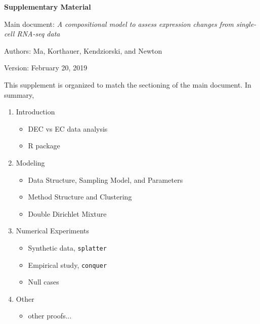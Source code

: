 \documentclass[aoas,preprint]{imsart}
\begin{document}
\large
\centerline{\bf Supplementary Material }

\noindent
Main document: {\em A compositional model to assess expression changes from single-cell RNA-seq data}

\vspace{.2in}
\noindent
Authors: Ma, Korthauer, Kendziorski, and Newton

\vspace{.2in}
\noindent
Version: February 20, 2019

\vspace{.4in}

\noindent
This supplement is organized to match the sectioning of the main document.   In summary,

\begin{enumerate}
\item Introduction
   \begin{itemize}
   \item DEC vs EC data analysis
   \item R package
   \end{itemize}
\item Modeling
 \begin{itemize}
  \item Data Structure, Sampling Model, and Parameters
  \item Method Structure and Clustering 
  \item Double Dirichlet Mixture
  \end{itemize}
\item Numerical Experiments
   \begin{itemize}
   \item Synthetic data, \verb+splatter+
   \item Empirical study, \verb+conquer+
   \item Null cases 
   \end{itemize}
\item Other
  \begin{itemize}
   \item other proofs...
  \end{itemize}
\end{enumerate}
\end{document}
